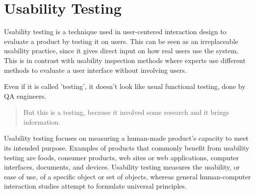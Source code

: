 \section{Usability Testing}
\label{sec:Usability Testing}

Usability testing is a technique used in user-centered interaction design to evaluate a product by testing it on users. This can be seen as an irreplaceable usability practice, since it gives direct input on how real users use the system. This is in contrast with usability inspection methods where experts use different methods to evaluate a user interface without involving users.

Even if it is called 'testing', it doesn't look like usual functional testing, done by QA engineers.

\begin{quote}
 But this is a testing, because it involved some research and it brings information.
\end{quote} 

Usability testing focuses on measuring a human-made product's capacity to meet its intended purpose. Examples of products that commonly benefit from usability testing are foods, consumer products, web sites or web applications, computer interfaces, documents, and devices. Usability testing measures the usability, or ease of use, of a specific object or set of objects, whereas general human-computer interaction studies attempt to formulate universal principles.